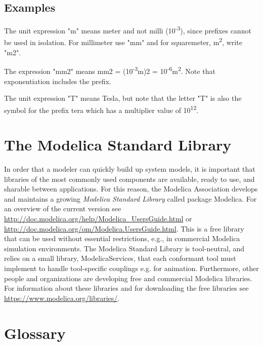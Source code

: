 \documentclass[10pt,a4paper]{report}
\def\doublelabel#1{\label{#1}}
\begin{document}
\section{Examples}\doublelabel{examples2}

The unit expression "m" means meter and not milli
(10\textsuperscript{-3}), since prefixes cannot be used in isolation.
For millimeter use "mm" and for squaremeter, m\textsuperscript{2}, write
"m2".

The expression "mm2" means mm2 = (10\textsuperscript{-3}m)2 =
10\textsuperscript{-6}m\textsuperscript{2}. Note that exponentiation
includes the prefix.

The unit expression "T" means Tesla, but note that the letter "T" is
also the symbol for the prefix tera which has a multiplier value of
10\textsuperscript{12}.

\chapter{The Modelica Standard Library}\doublelabel{the-modelica-standard-library}

In order that a modeler can quickly build up system models, it is
important that libraries of the most commonly used components are
available, ready to use, and sharable between applications. For this
reason, the Modelica Association develops and maintains a growing
\emph{Modelica Standard Library} called package Modelica. For an
overview of the current version see
\url{http://doc.modelica.org/help/Modelica_UsersGuide.html} or
\url{http://doc.modelica.org/om/Modelica.UsersGuide.html}. This is a
free library that can be used without essential restrictions, e.g., in
commercial Modelica simulation environments. The Modelica Standard
Library is tool-neutral, and relies on a small library,
ModelicaServices, that each conformant tool must implement to handle
tool-specific couplings e.g. for animation. Furthermore, other people
and organizations are developing free and commercial Modelica libraries.
For information about these libraries and for downloading the free
libraries see \url{https://www.modelica.org/libraries/}.

\appendix
\chapter{Glossary}\doublelabel{glossary}
\end{document}
